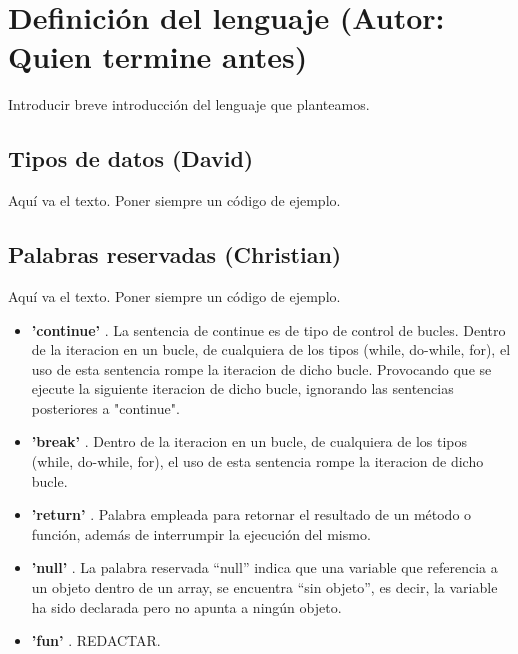 \documentclass[11pt, english]{article}
\begin{document}
\newcommand{\CC}{C\nolinebreak\hspace{-.05em}\raisebox{.4ex}{\tiny\bf +}\nolinebreak\hspace{-.10em}\raisebox{.4ex}{\tiny\bf +}}
\def\CC{{C\nolinebreak[4]\hspace{-.05em}\raisebox{.4ex}{\tiny\bf ++}}}

\tableofcontents
\newpage

\section{Definición del lenguaje (Autor: Quien termine antes)}
Introducir breve introducción del lenguaje que planteamos.
\newpage

\subsection{Tipos de datos (David)}
Aquí va el texto. Poner siempre un código de ejemplo.
\newpage

\subsection{Palabras reservadas (Christian)}
Aquí va el texto. Poner siempre un código de ejemplo.
\begin{itemize}
	\item \textbf{'continue'} . La sentencia de continue es de tipo de control de bucles. Dentro de la iteracion en un bucle, de cualquiera de los tipos (while, do-while, for), el uso de esta sentencia rompe la iteracion de dicho bucle. Provocando que se ejecute la siguiente iteracion de dicho bucle, ignorando las sentencias posteriores a "continue".
	\item \textbf{'break'} . Dentro de la iteracion en un bucle, de cualquiera de los tipos (while, do-while, for), el uso de esta sentencia rompe la iteracion de dicho bucle.
	\item \textbf{'return'} . Palabra empleada para retornar el resultado de un método o función, además de interrumpir la ejecución del mismo.
	\item \textbf{'null'} . La palabra reservada “null” indica que una variable que referencia a un objeto dentro de un array, se encuentra “sin objeto”, es decir, la variable ha sido declarada pero no apunta a ningún objeto.
	\item \textbf{'fun'} . REDACTAR.
\end{itemize}
\newpage
\end{document}
